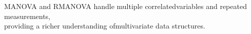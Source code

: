 \documentclass[preview]{standalone}
\begin{document}
\begin{center}
MANOVA and RMANOVA handle multiple correlated\n variables and repeated measurements,\\providing a richer understanding of\n multivariate data structures.
\end{center}
\end{document}
